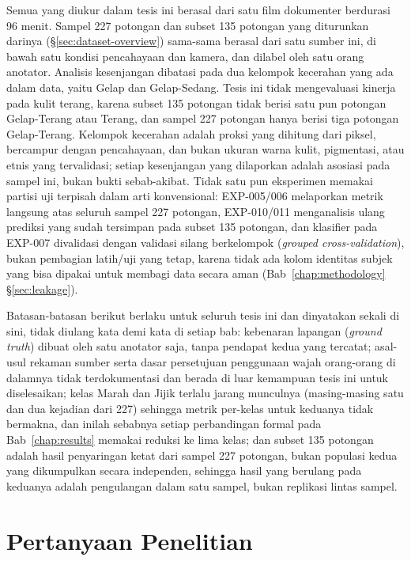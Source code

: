 Semua yang diukur dalam tesis ini berasal dari satu film dokumenter berdurasi 96 menit. Sampel 227 potongan dan subset 135 potongan yang diturunkan darinya (\S\ref{sec:dataset-overview}) sama-sama berasal dari satu sumber ini, di bawah satu kondisi pencahayaan dan kamera, dan dilabel oleh satu orang anotator. Analisis kesenjangan dibatasi pada dua kelompok kecerahan yang ada dalam data, yaitu Gelap dan Gelap-Sedang. Tesis ini tidak mengevaluasi kinerja pada kulit terang, karena subset 135 potongan tidak berisi satu pun potongan Gelap-Terang atau Terang, dan sampel 227 potongan hanya berisi tiga potongan Gelap-Terang. Kelompok kecerahan adalah proksi yang dihitung dari piksel, bercampur dengan pencahayaan, dan bukan ukuran warna kulit, pigmentasi, atau etnis yang tervalidasi; setiap kesenjangan yang dilaporkan adalah asosiasi pada sampel ini, bukan bukti sebab-akibat. Tidak satu pun eksperimen memakai partisi uji terpisah dalam arti konvensional: EXP-005/006 melaporkan metrik langsung atas seluruh sampel 227 potongan, EXP-010/011 menganalisis ulang prediksi yang sudah tersimpan pada subset 135 potongan, dan klasifier pada EXP-007 divalidasi dengan validasi silang berkelompok (\textit{grouped cross-validation}), bukan pembagian latih/uji yang tetap, karena tidak ada kolom identitas subjek yang bisa dipakai untuk membagi data secara aman (Bab~\ref{chap:methodology} \S\ref{sec:leakage}).

Batasan-batasan berikut berlaku untuk seluruh tesis ini dan dinyatakan sekali di sini, tidak diulang kata demi kata di setiap bab: kebenaran lapangan (\textit{ground truth}) dibuat oleh satu anotator saja, tanpa pendapat kedua yang tercatat; asal-usul rekaman sumber serta dasar persetujuan penggunaan wajah orang-orang di dalamnya tidak terdokumentasi dan berada di luar kemampuan tesis ini untuk diselesaikan; kelas Marah dan Jijik terlalu jarang munculnya (masing-masing satu dan dua kejadian dari 227) sehingga metrik per-kelas untuk keduanya tidak bermakna, dan inilah sebabnya setiap perbandingan formal pada Bab~\ref{chap:results} memakai reduksi ke lima kelas; dan subset 135 potongan adalah hasil penyaringan ketat dari sampel 227 potongan, bukan populasi kedua yang dikumpulkan secara independen, sehingga hasil yang berulang pada keduanya adalah pengulangan dalam satu sampel, bukan replikasi lintas sampel.

\section{Pertanyaan Penelitian}
\label{sec:rq}

